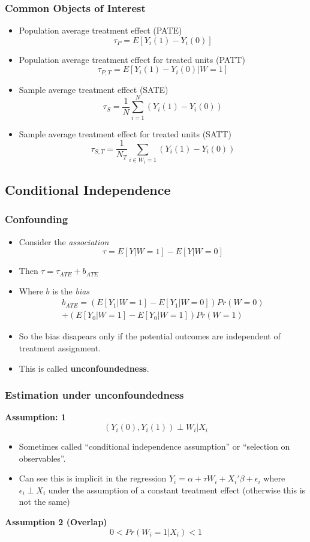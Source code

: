 \begin{frame}
  \frametitle{Common Objects of Interest}
  \begin{itemize}
    \item Population average treatment effect (PATE)
      $$ \tau_P = E \left[ Y_i(1) - Y_i(0) \right] $$
    \item Population average treatment effect for treated units (PATT)
      $$ \tau_{P,T} = E \left[ Y_i(1) - Y_i(0) | W = 1 \right] $$
    \item Sample average treatment effect (SATE)
      $$ \tau_S = \frac{1}{N} \sum_{i=1}^N ( Y_i(1) - Y_i(0) ) $$
    \item Sample average treatment effect for treated units (SATT)
      $$ \tau_{S,T} = \frac{1}{N_T} \sum_{i \in W_i=1} ( Y_i(1) - Y_i(0) ) $$
  \end{itemize}
\end{frame}

\subsection{Conditional Independence}

\begin{frame}
  \frametitle{Confounding}
  \begin{itemize}
  \item Consider the \textit{association} 
  $$ \tau = E \left[ Y | W= 1 \right] - E \left[ Y | W= 0 \right] $$
  \item Then $ \tau = \tau_{ATE} + b_{ATE} $
  \item Where $b$ is the \textit{bias}
  \begin{multline*}
    b_{ATE} =  ( E \left[ Y_1 | W= 1 \right] - E \left[ Y_1 | W= 0 \right])Pr(W=0) \\ 
              + ( E \left[ Y_0 | W= 1 \right] - E \left[ Y_0 | W= 1 \right])Pr(W=1) 
  \end{multline*}
  \item So the bias disapears only if the potential outcomes are independent of treatment assignment. 
  \item This is called \textbf{unconfoundedness}. 
  \end{itemize}
\end{frame}
  
\begin{frame}
  \frametitle{Estimation under unconfoundedness}
   \textbf{Assumption: 1 } $$ \left(Y_i(0),Y_i(1) \right) \perp W_i | X_i $$
  \begin{itemize}
  \item Sometimes called ``conditional independence assumption'' or ``selection on observables''. 
  \item Can see this is implicit in the regression $Y_i = \alpha + \tau W_i + X_i'\beta + \epsilon_i$ where $\epsilon_i \perp X_i$ 
  under the assumption of a constant treatment effect (otherwise this is not the same)
  \end{itemize}

  \textbf{Assumption 2  (Overlap)} $$ 0 < Pr(W_i = 1 | X_i) < 1 $$
\end{frame}
  
